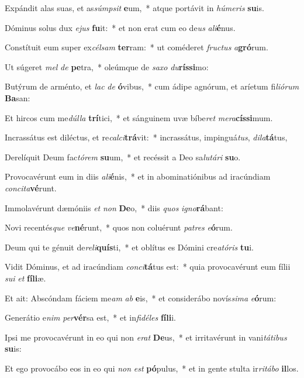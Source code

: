 \item Expándit alas suas, et as\textit{súmp}\textit{sit} \textbf{e}um,~* atque portávit in \textit{hú}\textit{me}\textit{ris} \textbf{su}is.
\item Dóminus solus dux \textit{e}\textit{jus} \textbf{fu}it:~* et non erat cum eo de\textit{us} \textit{a}\textit{li}\textbf{é}nus.
\item Constítuit eum super ex\textit{cél}\textit{sam} \textbf{ter}ram:~* ut coméderet \textit{fruc}\textit{tus} \textit{a}\textbf{gró}rum.
\item Ut súgeret \textit{mel} \textit{de} \textbf{pe}tra,~* oleúmque de \textit{sa}\textit{xo} \textit{du}\textbf{rís}\textbf{si}mo:
\item Butýrum de arménto, et \textit{lac} \textit{de} \textbf{ó}vibus,~* cum ádipe agnórum, et aríetum fi\textit{li}\textit{ó}\textit{rum} \textbf{Ba}san:
\item Et hircos cum me\textit{dúl}\textit{la} \textbf{trí}tici,~* et sánguinem uvæ bíbe\textit{ret} \textit{me}\textit{ra}\textbf{cís}\textbf{si}mum.
\item Incrassátus est diléctus, et re\textit{cal}\textit{ci}\textbf{trá}vit:~* incrassátus, impinguá\textit{tus}, \textit{di}\textit{la}\textbf{tá}tus,
\item Derelíquit Deum fac\textit{tó}\textit{rem} \textbf{su}um,~* et recéssit a Deo sa\textit{lu}\textit{tá}\textit{ri} \textbf{su}o.
\item Provocavérunt eum in diis \textit{a}\textit{li}\textbf{é}nis,~* et in abominatiónibus ad iracúndiam \textit{con}\textit{ci}\textit{ta}\textbf{vé}runt.
\item Immolavérunt dæmóniis \textit{et} \textit{non} \textbf{De}o,~* diis \textit{quos} \textit{i}\textit{gno}\textbf{rá}bant:
\item Novi recentés\textit{que} \textit{ve}\textbf{né}runt,~* quos non coluérunt \textit{pa}\textit{tres} \textit{e}\textbf{ó}rum.
\item Deum qui te génuit de\textit{re}\textit{li}\textbf{quís}ti,~* et oblítus es Dómini cre\textit{a}\textit{tó}\textit{ris} \textbf{tu}i.
\item Vidit Dóminus, et ad iracúndiam \textit{con}\textit{ci}\textbf{tá}tus est:~* quia provocavérunt eum fílii \textit{su}\textit{i} \textit{et} \textbf{fí}\textbf{li}æ.
\item Et ait: Abscóndam fáciem me\textit{am} \textit{ab} \textbf{e}is,~* et considerábo novís\textit{si}\textit{ma} \textit{e}\textbf{ó}rum:
\item Generátio e\textit{nim} \textit{per}\textbf{vér}sa est,~* et in\textit{fi}\textit{dé}\textit{les} \textbf{fí}\textbf{li}i.
\item Ipsi me provocavérunt in eo qui non \textit{e}\textit{rat} \textbf{De}us,~* et irritavérunt in vani\textit{tá}\textit{ti}\textit{bus} \textbf{su}is:
\item Et ego provocábo eos in eo qui \textit{non} \textit{est} \textbf{pó}pulus,~* et in gente stulta ir\textit{ri}\textit{tá}\textit{bo} \textbf{il}los.
